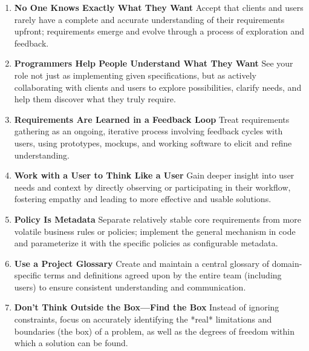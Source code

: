 \documentclass[11pt]{article}
\begin{document}
\begin{tcolorbox}[pragchapterbox={Chapter 8: Before the Project}]
\begin{multicols}{2}
\begin{enumerate}[label=\arabic*., start=75, itemsep=1ex, topsep=0pt, partopsep=0pt, labelwidth=!, labelindent=0pt, leftmargin=*]
    \item \textbf{No One Knows Exactly What They Want}
    Accept that clients and users rarely have a complete and accurate understanding of their requirements upfront; requirements emerge and evolve through a process of exploration and feedback.

    \item \textbf{Programmers Help People Understand What They Want}
    See your role not just as implementing given specifications, but as actively collaborating with clients and users to explore possibilities, clarify needs, and help them discover what they truly require.

    \item \textbf{Requirements Are Learned in a Feedback Loop}
    Treat requirements gathering as an ongoing, iterative process involving feedback cycles with users, using prototypes, mockups, and working software to elicit and refine understanding.

    \item \textbf{Work with a User to Think Like a User}
    Gain deeper insight into user needs and context by directly observing or participating in their workflow, fostering empathy and leading to more effective and usable solutions.

    \item \textbf{Policy Is Metadata}
    Separate relatively stable core requirements from more volatile business rules or policies; implement the general mechanism in code and parameterize it with the specific policies as configurable metadata.

    \item \textbf{Use a Project Glossary}
    Create and maintain a central glossary of domain-specific terms and definitions agreed upon by the entire team (including users) to ensure consistent understanding and communication.

    \item \textbf{Don't Think Outside the Box—Find the Box}
    Instead of ignoring constraints, focus on accurately identifying the *real* limitations and boundaries (the box) of a problem, as well as the degrees of freedom within which a solution can be found.
\end{enumerate}
\end{multicols}
\end{tcolorbox}
\end{document}
